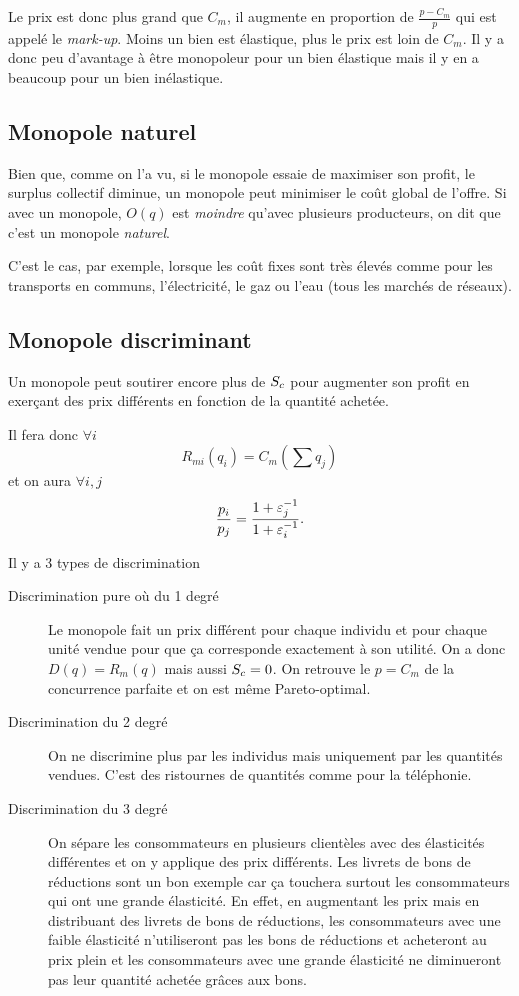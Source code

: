 Le prix est donc plus grand que $C_m$, il augmente en proportion de
$\frac{p-C_m}{p}$ qui est appelé le \emph{mark-up}.
Moins un bien est élastique, plus le prix est loin de $C_m$.
Il y a donc peu d'avantage à être monopoleur pour un bien élastique
mais il y en a beaucoup pour un bien inélastique.

\subsection{Monopole naturel}
Bien que, comme on l'a vu, si le monopole essaie de maximiser
son profit, le surplus collectif diminue,
un monopole peut minimiser le coût global de l'offre.
Si avec un monopole, $O(q)$ est \emph{moindre} qu'avec plusieurs producteurs,
on dit que c'est un monopole \emph{naturel}.

C'est le cas, par exemple, lorsque les coût fixes sont très élevés comme
pour les transports en communs, l'électricité, le gaz ou l'eau
(tous les marchés de réseaux).

\subsection{Monopole discriminant}
Un monopole peut soutirer encore plus de ${S_c}$ pour augmenter
son profit en exerçant des prix différents en fonction de la quantité
achetée.

Il fera donc $\forall i$
\[ R_{mi}(q_i) = C_m(\sum q_j) \]
et on aura $\forall i,j$
\[ \frac{p_i}{p_j} = \frac{1+\varepsilon_j^{-1}}{1+\varepsilon_i^{-1}}. \]

Il y a 3 types de discrimination
\begin{description}
  \item[Discrimination pure où du 1\ier{} degré]
    Le monopole fait un prix différent pour chaque individu et pour chaque
    unité vendue pour que ça corresponde exactement à son utilité.
    On a donc $D(q) = R_m(q)$ mais aussi ${S_c} = 0$.
    On retrouve le $p = C_m$ de la concurrence parfaite et on est même
    Pareto-optimal.
  \item[Discrimination du 2\ieme{} degré]
    On ne discrimine plus par les individus mais uniquement par les quantités
    vendues.
    C'est des ristournes de quantités comme pour la téléphonie.
  \item[Discrimination du 3\ieme{} degré]
    On sépare les consommateurs en plusieurs clientèles avec des élasticités
    différentes et on y applique des prix différents.
    Les livrets de bons de réductions sont un bon exemple car
    ça touchera surtout les consommateurs qui ont une grande élasticité.
    En effet, en augmentant les prix mais en distribuant des livrets
    de bons de réductions, les consommateurs avec une faible élasticité
    n'utiliseront pas les bons de réductions et acheteront au prix plein
    et les consommateurs avec une grande élasticité ne diminueront pas
    leur quantité achetée grâces aux bons.
\end{description}

